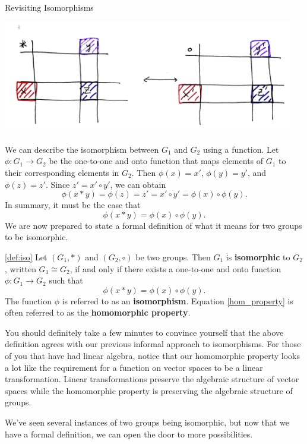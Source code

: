 \begin{section}{Revisiting Isomorphisms}
\begin{center}
\includegraphics[width=5in]{isoGroupTables.png}
\end{center}

We can describe the isomorphism between $G_1$ and $G_2$ using a function.  Let $\phi:G_1\to G_2$ be the one-to-one and onto function that maps elements of $G_1$ to their corresponding elements in $G_2$.  Then $\phi(x)=x'$, $\phi(y)=y'$, and $\phi(z)=z'$.  Since $z'=x'\circ y'$, we can obtain
\[
\phi(x*y)=\phi(z)=z'=x'\circ y'=\phi(x)\circ \phi(y).
\]
In summary, it must be the case that 
\[
\phi(x*y)=\phi(x)\circ \phi(y).
\]
We are now prepared to state a formal definition of what it means for two groups to be isomorphic.

\begin{definition}\ref{def:iso}
Let $(G_1,*)$ and $(G_2,\circ)$ be two groups.  Then $G_1$ is \textbf{isomorphic} to $G_2$, written $G_1\cong G_2$, if and only if there exists a one-to-one and onto function $\phi:G_1\to G_2$ such that
\begin{equation}\label{hom_property}
\phi(x*y)=\phi(x)\circ \phi(y).
\end{equation}
The function $\phi$ is referred to as an \textbf{isomorphism}.  Equation \ref{hom_property} is often referred to as the \textbf{homomorphic property}.
\end{definition}

You should definitely take a few minutes to convince yourself that the above definition agrees with our previous informal approach to isomorphisms.  For those of you that have had linear algebra, notice that our homomorphic property looks a lot like the requirement for a function on vector spaces to be a linear transformation.  Linear transformations preserve the algebraic structure of vector spaces while the homomorphic property is preserving the algebraic structure of groups.

We've seen several instances of two groups being isomorphic, but now that we have a formal definition, we can open the door to more possibilities.


\end{section}
